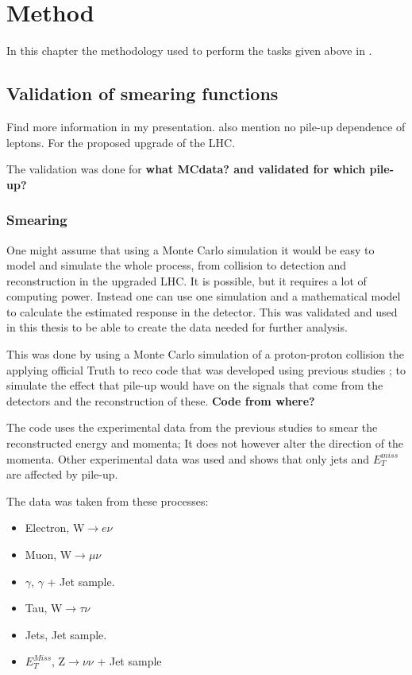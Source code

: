 \chapter{Method}\label{cha:meth}
In this chapter the methodology used to perform the tasks given above in .
\newpage
\section{Validation of smearing functions}
Find more information in my presentation. also mention no pile-up dependence of leptons.
For the proposed upgrade of the LHC.

The validation was done for \textbf{what MCdata? and validated for which pile-up?}

\subsection{Smearing}
One might assume that using a Monte Carlo simulation it would be easy to model and simulate the whole process, from collision to detection and reconstruction in the upgraded LHC. It is possible, but it requires a lot of computing power. Instead one can use one simulation and a mathematical model to calculate the estimated response in the detector. This was validated and used in this thesis to be able to create the data needed for further analysis. 

This was done by using a Monte Carlo simulation of a proton-proton collision the applying official Truth to reco code that was developed using previous studies \citep{ATL-PHYS-PUB-2013-004}; to simulate the effect that pile-up would have on the signals that come from the detectors and the reconstruction of these. \textbf{Code from where?}

The code uses the experimental data from the previous studies to smear the reconstructed energy and momenta; It does not however alter the direction of the momenta. Other experimental data was used and shows that only jets and $E^{miss}_T$ are affected by pile-up. 

The data was taken from these processes:
\begin{itemize}
\item Electron, W$\rightarrow e\nu$
\item Muon, W$\rightarrow \mu \nu$
\item $\gamma$, $\gamma$ + Jet sample.
\item Tau, W$\rightarrow \tau \nu$
\item Jets, Jet sample.
\item $E_T^{Miss}$, Z$\rightarrow \nu \nu$ + Jet sample
\end{itemize}


